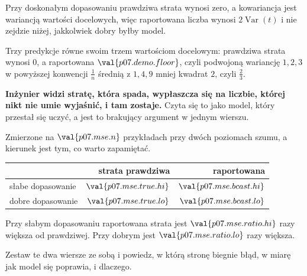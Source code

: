 \begin{fr}
Przy doskonałym dopasowaniu prawdziwa strata wynosi zero, a kowariancja jest
wariancją wartości docelowych, więc raportowana liczba wynosi
$2\operatorname{Var}(t)$ i nie zejdzie niżej, jakkolwiek dobry byłby model.


Trzy predykcje równe swoim trzem wartościom docelowym: prawdziwa strata wynosi
$0$, a raportowana $\val{p07.demo.floor}$, czyli podwojoną wariancję
$1, 2, 3$ w powyższej konwencji $\frac{1}{n}$ \dash{} średnią z $1, 4, 9$ mniej
kwadrat $2$, czyli $\frac{2}{3}$.

\textbf{Inżynier widzi stratę, która spada, wypłaszcza się na liczbie, której
nikt nie umie wyjaśnić, i tam zostaje.} Czyta się to jako model, który
przestał się uczyć, a jest to brakujący argument w jednym wierszu.
\end{fr}

\begin{fr}
Zmierzone na $\val{p07.mse.n}$ przykładach przy dwóch poziomach szumu, a
kierunek jest tym, co warto zapamiętać.

\begin{center}
\begin{tabular}{lrr}
\toprule
 & strata prawdziwa & raportowana \\
\midrule
słabe dopasowanie & $\val{p07.mse.true.hi}$ & $\val{p07.mse.bcast.hi}$ \\
dobre dopasowanie & $\val{p07.mse.true.lo}$ & $\val{p07.mse.bcast.lo}$ \\
\bottomrule
\end{tabular}
\end{center}

Przy słabym dopasowaniu raportowana strata jest $\val{p07.mse.ratio.hi}$ razy
większa od prawdziwej. Przy dobrym jest $\val{p07.mse.ratio.lo}$ razy większa.

Zestaw te dwa wiersze ze sobą i powiedz, w którą stronę biegnie błąd, w miarę
jak model się poprawia, i dlaczego.
\dotline
\nextframe
\end{fr}

